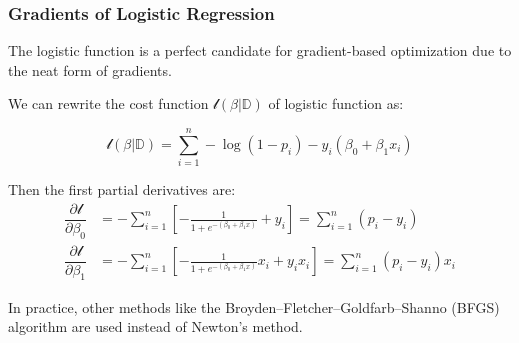 \documentclass[10pt,aspectratio=169]{beamer}
\begin{document}
      \begin{frame}
        \frametitle{Gradients of Logistic Regression}
%
        The logistic function is a perfect candidate for
        gradient-based optimization due to the neat form of gradients.

        \vfill We can rewrite the cost function
        $\mathscr{l}(\beta|\mathbb{D})$ of logistic function as:

        \begin{equation*}
          \mathscr{l}(\beta|\mathbb{D}) = \sum_{i=1}^{n}  -\log (1 - p_{i}) - y_{i} (\beta_{0} + \beta_{1}x_{i})
        \end{equation*}

        Then the first partial derivatives are:
        \begin{align*}
          \dfrac{\partial \mathscr{l}}{\partial \beta_{0}}
          &= -\sum_{i=1}^{n} \left[ -\frac{1}{1 + e^{-(\beta_{0} + \beta_{1} x)}} + y_{i} \right] = \sum_{i=1}^{n} (p_{i} - y_{i})\\
          \dfrac{\partial \mathscr{l}}{\partial \beta_{1}}
          &= -\sum_{i=1}^{n} \left[ -\frac{1}{1 + e^{-(\beta_{0} + \beta_{1} x)}}x_{i} + y_{i}x_{i} \right]= \sum_{i=1}^{n} (p_{i} - y_{i})x_{i}
        \end{align*}
        
        \vfill In practice, other methods like the
        Broyden–Fletcher–Goldfarb–Shanno (BFGS) algorithm are used
        instead of Newton's method.

        
      \end{frame}
\end{document}
